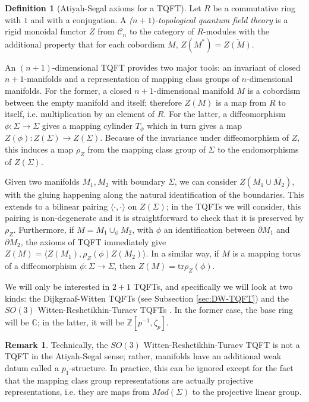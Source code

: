 \documentclass[12pt]{amsart}
\theoremstyle{definition}
\newtheorem{dfn}[thm]{Definition}
\newtheorem{rem}[thm]{Remark}
\newcommand{\ra}{\rightarrow}
\newcommand{\C}{\mathbb{C}}
\newcommand{\Z}{\mathbb{Z}}
\begin{document}
\begin{dfn}[Atiyah-Segal axioms for a TQFT]	
	Let $R$ be a commutative ring with $1$ and with a conjugation. A \emph{($n+1)$-topological quantum field theory} is a rigid monoidal functor $Z$ from $\mathcal{C}_n$ to the category of $R$-modules with the additional property that for each cobordism $M$, $Z(M^*)=\overline{Z(M)}$.	
\end{dfn}

An $(n+1)$-dimensional TQFT provides two major tools: an invariant of closed $n+1$-manifolds and a representation of mapping class groups of $n$-dimensional manifolds. For the former, a closed $n+1$-dimensional manifold $M$ is a cobordism between the empty manifold and itself; therefore $Z(M)$ is a map from $R$ to itself, i.e. multiplication by an element of $R$. For the latter, a diffeomorphism $\phi: \Sigma\ra \Sigma$ gives a mapping cylinder $T_\phi$ which in turn gives a map $Z(\phi): Z(\Sigma)\ra Z(\Sigma)$. Because of the invariance under diffeomorphism of $Z$, this induces a map $\rho_Z$ from the mapping class group of $\Sigma$ to the endomorphisms of $Z(\Sigma)$. 

Given two manifolds $M_1,M_2$ with boundary $\Sigma$, we can consider $Z(M_1\cup \overline{M_2})$, with the gluing happening along the natural identification of the boundaries. This extends to a bilinear pairing $\langle\cdot,\cdot\rangle$ on $Z(\Sigma)$; in the TQFTs we will consider, this pairing is non-degenerate and it is straightforward to check that it is preserved by $\rho_Z$. Furthermore, if $M= M_1\cup_\phi M_2$, with $\phi$ an identification between $\partial M_1$ and $\partial M_2$, the axioms of TQFT immediately give $Z(M)=\langle Z(M_1),\rho_Z(\phi)Z(M_2)\rangle$. In a similar way, if $M$ is a mapping torus of a diffeomorphism $\phi:\Sigma\ra \Sigma$, then $Z(M)=\mathrm{tr} \rho_Z(\phi)$.

We will only be interested in $2+1$ TQFTs, and specifically we will look at two kinds: the Dijkgraaf-Witten TQFTs (see Subsection \ref{sec:DW-TQFT}) and the $SO(3)$ Witten-Reshetikhin-Turaev TQFTs \cite{BHMV}. In the former case, the base ring will be $\C$; in the latter, it will be $\Z\left[p^{-1},\zeta_p\right]$.



\begin{rem}
	Technically, the $SO(3)$ Witten-Reshetikhin-Turaev TQFT is not a TQFT in the Atiyah-Segal sense; rather, manifolds have an additional weak datum called a $p_1$-structure. In practice, this can be ignored except for the fact that the mapping class group representations are actually projective representations, i.e. they are maps from $Mod(\Sigma)$ to the projective linear group. 
\end{rem}
\end{document}
